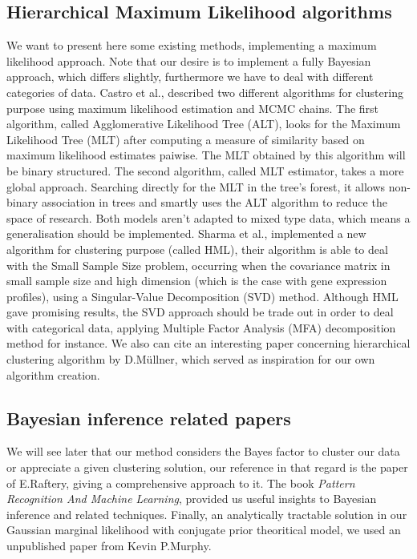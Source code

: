 \documentclass[twocolumn]{article}
\begin{document}
\subsection{Hierarchical Maximum Likelihood algorithms}

We want to present here some existing methods, implementing a maximum likelihood approach. Note that our desire is to implement a fully Bayesian approach, which differs slightly, furthermore we have to deal with different categories of data.
Castro et al.\cite{castro}, described two different algorithms for clustering purpose using maximum likelihood estimation and MCMC chains. The first algorithm, called Agglomerative Likelihood Tree (ALT), looks for the Maximum Likelihood Tree (MLT) after computing a measure of similarity based on maximum likelihood estimates paiwise.
The MLT obtained by this algorithm will be binary structured.
The second algorithm, called MLT estimator, takes a more global approach.
Searching directly for the MLT in the tree's forest, it allows non-binary association in trees and smartly uses the ALT algorithm to reduce the space of research. 
Both models aren't adapted to mixed type data, which means a generalisation should be implemented.
Sharma et al.\cite{sharma}, implemented a new algorithm for clustering purpose (called HML), their algorithm is able to deal with the Small Sample Size problem, occurring when the covariance matrix in small sample size and high dimension (which is the case with gene expression profiles), using a Singular-Value Decomposition (SVD) method.
Although HML gave promising results, the SVD approach should be trade out in order to deal with categorical data, applying Multiple Factor Analysis (MFA)\cite{pages} decomposition method for instance.
We also can cite an interesting paper concerning hierarchical clustering algorithm by D.Müllner\cite{mullner}, which served as inspiration for our own algorithm creation.

\subsection{Bayesian inference related papers}

We will see later that our method considers the Bayes factor to cluster our data or appreciate a given clustering solution, our reference in that regard is the paper of E.Raftery\cite{raftery}, giving a comprehensive approach to it.
The book \emph{Pattern Recognition And Machine Learning}\cite{bishop}, provided us useful insights to Bayesian inference and related techniques.
Finally, an analytically tractable solution in our Gaussian marginal likelihood with conjugate prior theoritical model, we used an unpublished paper from Kevin P.Murphy\cite{murphy}.
\end{document}
